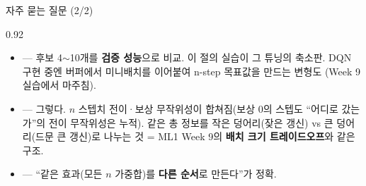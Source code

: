 \begin{frame}{자주 묻는 질문 (2/2)}
\begin{center}\begin{varwidth}{0.92\textwidth}
  \begin{itemize}
    \item {} --- 후보 4$\sim$10개를
      \textbf{검증 성능}으로 비교. 이 절의 실습이 그 튜닝의 축소판.
      DQN 구현 중엔 버퍼에서 미니배치를 이어붙여 n-step 목표값을
      만드는 변형도 (Week 9 실습에서 마주침).
    \item {}
      --- 그렇다. $n$ 스텝치 전이·보상 무작위성이 합쳐짐(보상 0의
      스텝도 ``어디로 갔는가''의 전이 무작위성은 누적). 같은 총
      정보를 작은 덩어리(잦은 갱신) vs 큰 덩어리(드문 큰 갱신)로
      나누는 것 = ML1 Week 9의 \textbf{배치 크기 트레이드오프}와
      같은 구조.
    \item {} --- ``같은
      효과(모든 $n$ 가중합)를 \textbf{다른 순서}로 만든다''가 정확.
  \end{itemize}
\end{varwidth}\end{center}
\end{frame}
